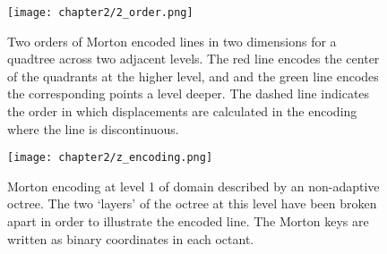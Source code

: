 \begin{figure}[!h]
    \centering
    {\texttt{[image: chapter2/2\_order.png]}}
    \vspace{0pt}
    \caption{
        Two orders of Morton encoded lines in two dimensions for a quadtree across
        two adjacent levels. The red line encodes the center of the quadrants at the higher level,
        and and the green line encodes the corresponding points a level deeper.
        The dashed line indicates the order in which displacements are calculated
        in the encoding where the line is discontinuous.
    }
    \label{fig:2_2_multi_order}
\end{figure}


\begin{figure}[!h]
    \centering
    {\texttt{[image: chapter2/z\_encoding.png]}}
    \vspace{0pt}
    \caption{
        Morton encoding at level 1 of domain described by an non-adaptive octree.
        The two `layers' of the octree at this level have been broken apart
        in order to illustrate the encoded line. The Morton keys are written
        as binary coordinates in each octant.
    }
    \label{fig:2_2_morton_encoding}
\end{figure}